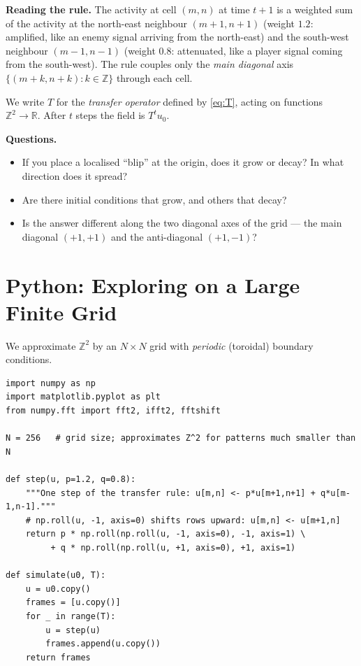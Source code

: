 \documentclass[11pt]{article}
\begin{document}
\medskip\noindent
\textbf{Reading the rule.}
The activity at cell $(m,n)$ at time $t+1$ is a weighted sum of the
activity at the north-east neighbour $(m{+}1,n{+}1)$ (weight $1.2$:
amplified, like an enemy signal arriving from the north-east) and the
south-west neighbour $(m{-}1,n{-}1)$ (weight $0.8$: attenuated, like
a player signal coming from the south-west).  The rule couples only
the \emph{main diagonal} axis $\{(m{+}k,n{+}k) : k\in\mathbb{Z}\}$
through each cell.

\medskip\noindent
We write $T$ for the \emph{transfer operator} defined by
\eqref{eq:T}, acting on functions $\mathbb{Z}^2\to\mathbb{R}$.
After $t$ steps the field is $T^t u_0$.

\medskip\noindent
\textbf{Questions.}
\begin{itemize}[nosep]
  \item If you place a localised ``blip'' at the origin, does it grow
    or decay?  In what direction does it spread?
  \item Are there initial conditions that grow, and others that decay?
  \item Is the answer different along the two diagonal axes of the grid
    --- the main diagonal $(+1,+1)$ and the anti-diagonal $(+1,-1)$?
\end{itemize}


\section*{Python: Exploring on a Large Finite Grid}

\noindent
We approximate $\mathbb{Z}^2$ by an $N\times N$ grid with
\emph{periodic} (toroidal) boundary conditions.

\begin{lstlisting}
import numpy as np
import matplotlib.pyplot as plt
from numpy.fft import fft2, ifft2, fftshift

N = 256   # grid size; approximates Z^2 for patterns much smaller than N

def step(u, p=1.2, q=0.8):
    """One step of the transfer rule: u[m,n] <- p*u[m+1,n+1] + q*u[m-1,n-1]."""
    # np.roll(u, -1, axis=0) shifts rows upward: u[m,n] <- u[m+1,n]
    return p * np.roll(np.roll(u, -1, axis=0), -1, axis=1) \
         + q * np.roll(np.roll(u, +1, axis=0), +1, axis=1)

def simulate(u0, T):
    u = u0.copy()
    frames = [u.copy()]
    for _ in range(T):
        u = step(u)
        frames.append(u.copy())
    return frames
\end{lstlisting}
\end{document}
